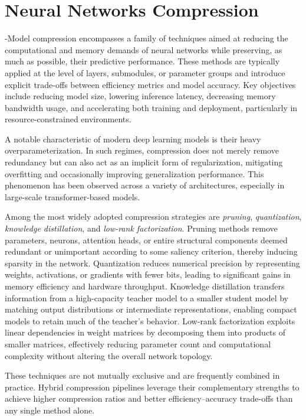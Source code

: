 \chapter{Neural Networks Compression}
-Model compression encompasses a family of techniques aimed at reducing the computational and memory demands of neural networks while preserving, as much as possible, their predictive performance. These methods are typically applied at the level of layers, submodules, or parameter groups and introduce explicit trade-offs between efficiency metrics and model accuracy. Key objectives include reducing model size, lowering inference latency, decreasing memory bandwidth usage, and accelerating both training and deployment, particularly in resource-constrained environments.

A notable characteristic of modern deep learning models is their heavy overparameterization. In such regimes, compression does not merely remove redundancy but can also act as an implicit form of regularization, mitigating overfitting and occasionally improving generalization performance. This phenomenon has been observed across a variety of architectures, especially in large-scale transformer-based models.

Among the most widely adopted compression strategies are \emph{pruning}, \emph{quantization}, \emph{knowledge distillation}, and \emph{low-rank factorization}. Pruning methods remove parameters, neurons, attention heads, or entire structural components deemed redundant or unimportant according to some saliency criterion, thereby inducing sparsity in the network. Quantization reduces numerical precision by representing weights, activations, or gradients with fewer bits, leading to significant gains in memory efficiency and hardware throughput. Knowledge distillation transfers information from a high-capacity teacher model to a smaller student model by matching output distributions or intermediate representations, enabling compact models to retain much of the teacher’s behavior. Low-rank factorization exploits linear dependencies in weight matrices by decomposing them into products of smaller matrices, effectively reducing parameter count and computational complexity without altering the overall network topology.

These techniques are not mutually exclusive and are frequently combined in practice. Hybrid compression pipelines leverage their complementary strengths to achieve higher compression ratios and better efficiency–accuracy trade-offs than any single method alone.

